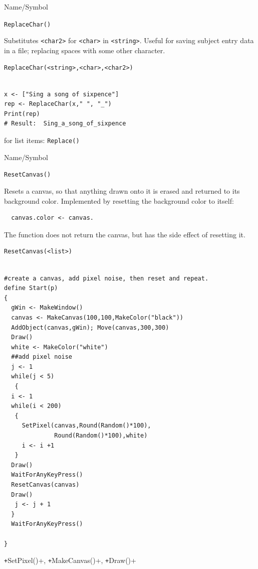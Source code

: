 \begin{desc}{Name/Symbol}
\item[Name/Symbol]  \verb+ReplaceChar()+

\item[Description]  	Substitutes  \verb+<char2>+ for \verb+<char>+
  in \verb+<string>+. Useful for saving subject entry data in a file;
  replacing spaces with some other character.

\item[Usage]        	
\begin{verbatim}
ReplaceChar(<string>,<char>,<char2>)
\end{verbatim}
			  
\item[Example]     	
\begin{verbatim}

x <- ["Sing a song of sixpence"]
rep <- ReplaceChar(x," ", "_")
Print(rep)
# Result:  Sing_a_song_of_sixpence
\end{verbatim}

\item[See Also]	
 for list items: \verb+Replace()+ 
\end{desc}

\begin{desc}{Name/Symbol}
\item[Name/Symbol]  \verb+ResetCanvas()+

\item[Description]  Resets a canvas, so that anything drawn onto it is
  erased and returned to its background color.  Implemented by
  resetting the background color to itself: 
\begin{verbatim}
  canvas.color <- canvas. 
\end{verbatim}
 The function does not return the canvas,
  but has the side effect of resetting it.


\item[Usage]        	
\begin{verbatim}
ResetCanvas(<list>)
\end{verbatim}
			  
\item[Example]     	
\begin{verbatim}

#create a canvas, add pixel noise, then reset and repeat.
define Start(p)
{
  gWin <- MakeWindow()
  canvas <- MakeCanvas(100,100,MakeColor("black"))
  AddObject(canvas,gWin); Move(canvas,300,300)
  Draw()
  white <- MakeColor("white")
  ##add pixel noise
  j <- 1
  while(j < 5)
   {
  i <- 1
  while(i < 200)
   {
     SetPixel(canvas,Round(Random()*100),
              Round(Random()*100),white)
     i <- i +1 
   }
  Draw()
  WaitForAnyKeyPress()
  ResetCanvas(canvas)
  Draw()
   j <- j + 1
  }
  WaitForAnyKeyPress()

}
\end{verbatim}

\item[See Also]	
\texttt+SetPixel()+, \texttt+MakeCanvas()+, \texttt+Draw()+
\end{desc}


